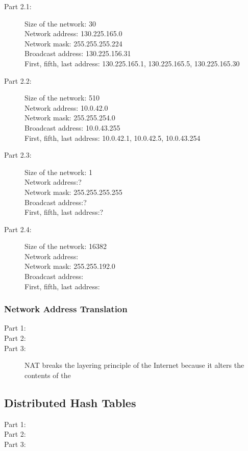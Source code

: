 \begin{description}
    \item[Part 2.1:]
        Size of the network: 30\\
        Network address: 130.225.165.0\\
        Network mask: 255.255.255.224\\
        Broadcast address: 130.225.156.31\\
        First, fifth, last address: 130.225.165.1, 130.225.165.5, 130.225.165.30
    \item[Part 2.2:]
        Size of the network: 510\\
        Network address: 10.0.42.0\\
        Network mask: 255.255.254.0\\
        Broadcast address: 10.0.43.255\\
        First, fifth, last address: 10.0.42.1, 10.0.42.5, 10.0.43.254
    \item[Part 2.3:]
        Size of the network: 1\\
        Network address:?\\
        Network mask: 255.255.255.255\\
        Broadcast address:?\\
        First, fifth, last address:?
    \item[Part 2.4:]
        Size of the network: 16382\\
        Network address: \\
        Network mask: 255.255.192.0\\
        Broadcast address: \\
        First, fifth, last address: 
\end{description}

\subsubsection{Network Address Translation}
\begin{description}
    \item[Part 1:]  
    \item[Part 2:]  
    \item[Part 3:] NAT breaks the layering principle of the Internet because it alters the
        contents of the 
\end{description}

\subsection{Distributed Hash Tables}
\begin{description}
    \item[Part 1:] 
    \item[Part 2:] 
    \item[Part 3:] 
\end{description}


